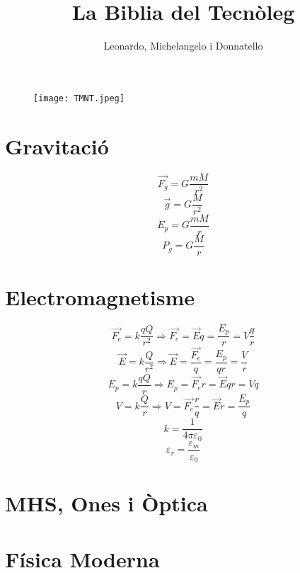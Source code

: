 \documentclass{article}
\title{La Biblia del Tecnòleg}
\author{Leonardo, Michelangelo i Donnatello}
\begin{document}
\begin{figure}
\centering
\texttt{[image: TMNT.jpeg]}
\end{figure}

\maketitle

\newpage
\section{Gravitació}
\[\vec{F_g}=G\frac{mM}{r^2}\]
\[\vec{g}=G\frac{M}{r^2}\]
\[E_p=G\frac{mM}{r}\]
\[P_g=G\frac{M}{r}\]


\section{Electromagnetisme}
\[\vec{F_e}=k\frac{qQ}{r^2} \Longrightarrow \vec{F_e}=\vec{E}q=\frac{E_p}{r}=V\frac{q}{r}\]
\[\vec{E}=k\frac{Q}{r^2} \Longrightarrow \vec{E}=\frac{\vec{F_e}}{q}=\frac{E_p}{qr}=\frac{V}{r}\]
\[E_p=k\frac{qQ}{r} \Longrightarrow E_p=\vec{F_e}r=\vec{E}qr=Vq \]
\[V=k\frac{Q}{r} \Longrightarrow V=\vec{F_e}\frac{r}{q}=\vec{E}r=\frac{E_p}{q} \]
\[k=\frac{1}{4\pi\varepsilon_0}\]
\[\varepsilon_r=\frac{\varepsilon_m}{\varepsilon_0}\]


\section{MHS, Ones i Òptica}
\section{Física Moderna}
\end{document}
